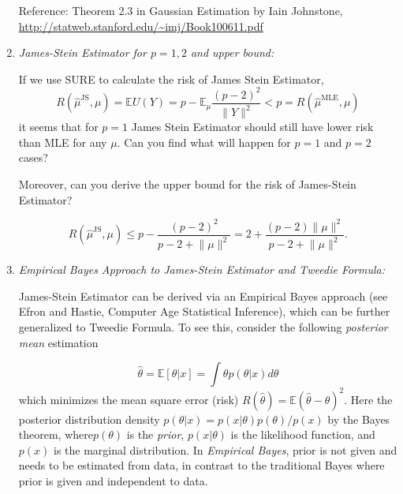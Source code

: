 \documentclass[11pt]{article}
\def\E{{\mathbb E}}
\begin{document}
\begin{enumerate}
Reference: Theorem 2.3 in Gaussian Estimation by Iain Johnstone,\\
\url{http://statweb.stanford.edu/~imj/Book100611.pdf}

\item {\em *James-Stein Estimator for $p=1,2$ and upper bound:} 

If we use SURE to calculate the risk of James Stein Estimator,
\[
	R(\hat{\mu}^{\text{JS}},\mu) = \E U(Y) 
	= p - \E_\mu \frac{(p-2)^2}{\lVert Y \rVert^2}
	< p = R(\hat{\mu}^{\text{MLE}},\mu)
\]
it seems that for $p=1$ James Stein Estimator should still have lower risk than MLE for any $\mu$. Can you find what will happen for $p=1$ and $p=2$ cases? 

Moreover, can you derive the upper bound for the risk of James-Stein Estimator?

\[
	R(\hat{\mu}^{\text{JS}},\mu) 
	\le p - \frac{(p-2)^2}{p-2+\lVert \mu \rVert^2} 
	= 2 + \frac{(p-2)\lVert \mu \rVert^2}{p-2+\lVert\mu\rVert^2}.
\]


\item {\em Empirical Bayes Approach to James-Stein Estimator and Tweedie Formula:} 

James-Stein Estimator can be derived via an Empirical Bayes approach (see Efron and Hastie, Computer Age Statistical Inference), which can be further generalized to Tweedie Formula. To see this, consider the following \emph{posterior mean} estimation

\[ \widehat{\theta} = \E [\theta|x] = \int \theta p(\theta | x) d\theta \] 
which minimizes the mean square error (risk) $R(\widehat{\theta}) = \E(\widehat{\theta} - \theta)^2$. Here the posterior distribution density $p(\theta|x) = p(x|\theta) p(\theta) / p(x)$ by the Bayes theorem, where$p(\theta)$ is the \emph{prior}, $p(x|\theta)$ is the likelihood function, and $p(x)$ is the marginal distribution. 
In \emph{Empirical Bayes}, prior is not given and needs to be estimated from data, in contrast to the traditional Bayes where prior is given and independent to data. 


\end{enumerate}
\end{document}
